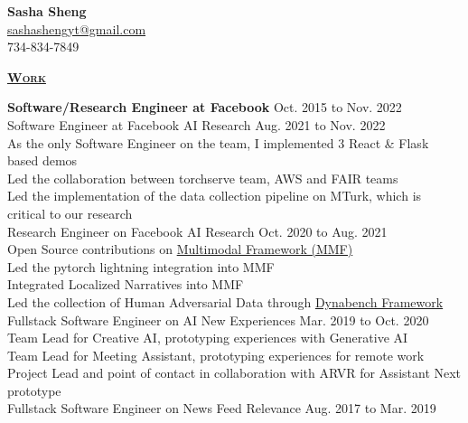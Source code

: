 \documentclass{article}
\newlength{\remaining}
\newcommand{\titleline}[1]{
\setlength{\remaining}{\textwidth-\widthof{\textsc{#1}}}
\noindent\underline{\textsc{#1}\hspace*{\remaining}}\par}
\begin{document}
    \thispagestyle{empty}
    \begin{center}
         \large{\textbf{Sasha Sheng}} \\
         \href{mailto:sashashengyt@gmail}{sashashengyt@gmail.com} \\
         734-834-7849
    \end{center}
  
    \titleline{\textbf{\large{Work}}}
 	\noindent\textbf{Software/Research Engineer at Facebook} \hfill Oct. 2015 to Nov. 2022 \\ 
 	    \indent Software Engineer at Facebook AI Research \hfill Aug. 2021 to Nov. 2022 \\
 	        \indent\indent As the only Software Engineer on the team, I implemented 3 React \& Flask based demos \\
 	        \indent\indent Led the collaboration between torchserve team, AWS and FAIR teams \\
 	        \indent\indent Led the implementation of the data collection pipeline on MTurk, which is critical to our research \\
 	    \indent Research Engineer on Facebook AI Research \hfill  Oct. 2020 to Aug. 2021 \\
 	        \indent\indent Open Source contributions on \href{https://github.com/facebookresearch/mmf}{Multimodal Framework (MMF)} \\
 	        \indent\indent Led the pytorch lightning integration into MMF \\
 	        \indent\indent Integrated Localized Narratives into MMF \\
 	        \indent\indent Led the collection of Human Adversarial Data through \href{www.dynabench.org}{Dynabench Framework} \\
		\indent Fullstack Software Engineer on AI New Experiences \hfill Mar. 2019 to Oct. 2020 \\
		    \indent\indent Team Lead for Creative AI, prototyping experiences with Generative AI  \\
		    \indent\indent Team Lead for Meeting Assistant, prototyping experiences for remote work \\
		    \indent\indent Project Lead and point of contact in collaboration with ARVR for Assistant Next prototype \\
		\indent Fullstack Software Engineer on News Feed Relevance \hfill Aug. 2017 to Mar. 2019 \\
\end{document}
